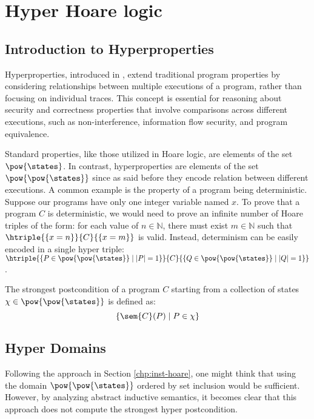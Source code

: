 \section{Hyper Hoare logic}

\subsection{Introduction to Hyperproperties}

Hyperproperties, introduced in \cite{Clarkson08}, extend traditional program 
properties by considering relationships between multiple executions of a 
program, rather than focusing on individual traces. This concept is essential 
for reasoning about security and correctness properties that involve comparisons 
across different executions, such as non-interference, information flow security, 
and program equivalence.

Standard properties, like those utilized in Hoare logic, are elements of the set 
$\pow{\states}$. In contrast, hyperproperties are elements of the set 
$\pow{\pow{\states}}$ since as said before they encode relation between different
executions. A common example is the property of a program being deterministic. 
Suppose our programs have only one integer variable named \(x\). 
To prove that a program \(C\) is deterministic, we would need to prove an 
infinite number of Hoare triples of the form: for each value of 
\(n \in \mathbb{N}\), there must exist \(m \in \mathbb{N}\) such that 
$\htriple{\{ x = n \}}{C}{\{ x = m \}}$ is valid. Instead, determinism can be 
easily encoded in a single hyper triple: $\htriple{\{ P \in \pow{\pow{\states}} 
\mid |P| = 1 \}}{C}{\{Q \in \pow{\pow{\states}} \mid |Q| = 1\}}$.

\begin{definition}
  The strongest postcondition of a program \(C\) starting from a collection of 
  states \(\chi \in \pow{\pow{\states}}\) is defined as:
  $$\{ \sem{C}(P) \mid P \in \chi \}$$
\end{definition}

\subsection{Hyper Domains}

Following the approach in Section \ref{chp:inst-hoare}, one might think that 
using the domain $\pow{\pow{\states}}$ ordered by set inclusion would be 
sufficient. However, by analyzing abstract inductive semantics, it becomes 
clear that this approach does not compute the strongest hyper postcondition.

